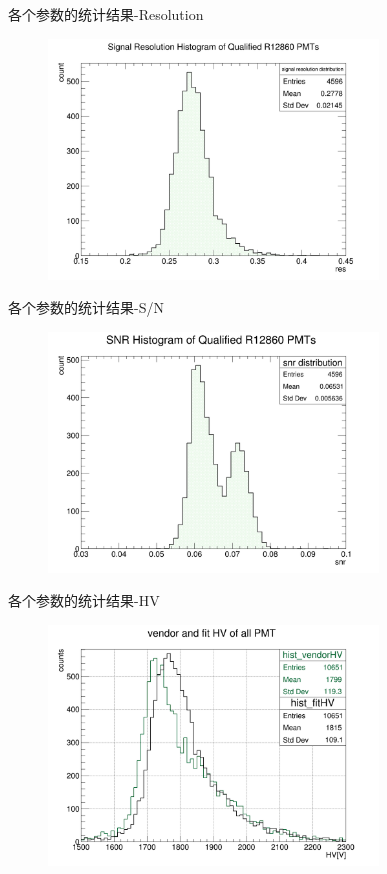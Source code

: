 \begin{frame}{各个参数的统计结果-Resolution}
\begin{figure}
\centering
\includegraphics[width=0.78\textwidth]{figures/res.png}
\end{figure}
\end{frame}
\begin{frame}{各个参数的统计结果-S/N}
\begin{figure}
\centering
\includegraphics[width=0.78\textwidth]{figures/snr.png}
\end{figure}
\end{frame}
\begin{frame}{各个参数的统计结果-HV}
\begin{figure}
\centering
\includegraphics[width=0.78\textwidth]{figures/vendorHV.png}
\end{figure}
\end{frame}
